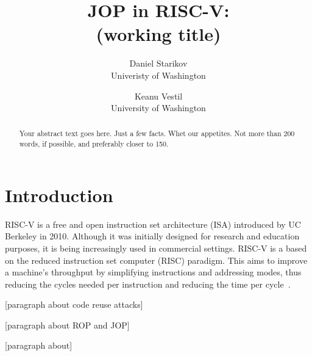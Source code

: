 
\date{}

\title{\Large \bf JOP in RISC-V:\\
  (working title)}

\author{
{\rm Daniel Starikov}\\
Univeristy of Washington
\and
{\rm Keanu Vestil}\\
University of Washington
} %

\maketitle

\begin{abstract}
Your abstract text goes here. Just a few facts. Whet our appetites.
Not more than 200 words, if possible, and preferably closer to 150.
\end{abstract}


\section{Introduction}

RISC-V is a free and open instruction set architecture (ISA) introduced by UC
Berkeley in 2010. Although it was initially designed for research and education
purposes, it is being increasingly used in commercial settings. RISC-V is a
based on the reduced instruction set computer (RISC) paradigm. This aims to
improve a machine's throughput by simplifying instructions and addressing modes,
thus reducing the cycles needed per instruction and reducing the time per cycle~\cite{patterson98risc}.

[paragraph about code reuse attacks]

[paragraph about ROP and JOP]

[paragraph about]

